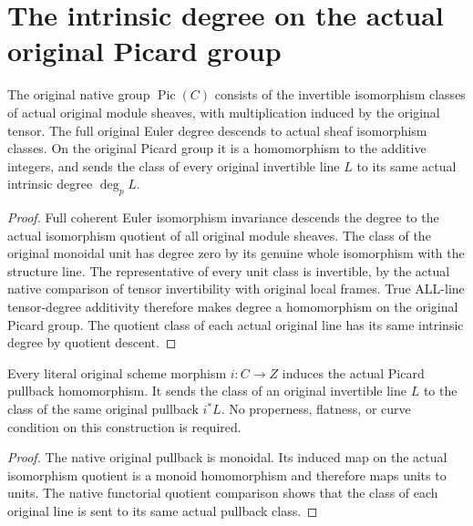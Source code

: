 \section{The intrinsic degree on the actual original Picard group}

\begin{definition}
\label{def:fc-original-curve-picard-degree}
\leanok
{}
The original native group $\operatorname{Pic}(C)$ consists of the
invertible isomorphism classes of actual original module sheaves, with
multiplication induced by the original tensor. The full original
Euler degree descends to actual sheaf isomorphism classes. On the
original Picard group it is a homomorphism to the additive integers,
and sends the class of every original invertible line $L$ to its
same actual intrinsic degree $\deg_p L$.
\end{definition}
\begin{proof}
Full coherent Euler isomorphism invariance descends the degree to the
actual isomorphism quotient of all original module sheaves. The class
of the original monoidal unit has degree zero by its genuine whole
isomorphism with the structure line. The representative of every
unit class is invertible, by the actual native comparison of tensor
invertibility with original local frames. True ALL-line tensor-degree
additivity therefore makes degree a homomorphism on the original
Picard group. The quotient class of each actual original line has its
same intrinsic degree by quotient descent.
\end{proof}

\begin{definition}
\label{def:fc-original-picard-pullback}
\leanok
{}
Every literal original scheme morphism $i:C\to Z$ induces the actual
Picard pullback homomorphism. It sends the class of an original
invertible line $L$ to the class of the same original pullback $i^*L$.
No properness, flatness, or curve condition on this construction is
required.
\end{definition}
\begin{proof}
The native original pullback is monoidal. Its induced map on the
actual isomorphism quotient is a monoid homomorphism and therefore
maps units to units. The native functorial quotient comparison shows
that the class of each original line is sent to its same actual
pullback class.
\end{proof}

